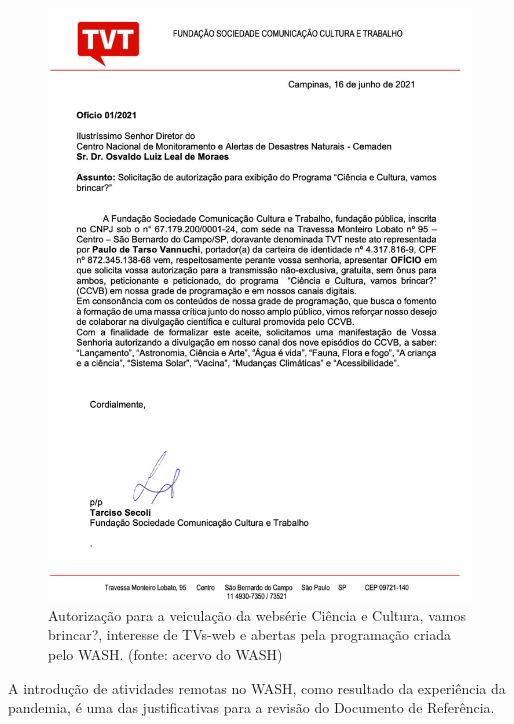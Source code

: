 \captionsetup{format=plain}
\begin{figure}[htb]

\centering


\begin{minipage}[b]{0.4\linewidth}
        \centering
                \includegraphics[width=1.0\linewidth]{../../../imagens/TVT.jpg}
                \caption{Autorização para a veiculação da websérie Ciência e Cultura, vamos brincar?, interesse de TVs-web e abertas pela programação criada pelo WASH. (fonte: acervo do WASH)}
                \label{51f9418c1ca6e2404e9d774513fb6c023d10b3bb}
\end{minipage}%
\hspace{0.5cm}
\end{figure}



A introdução de atividades remotas no WASH, como resultado da experiência da pandemia, é uma das justificativas para a revisão do Documento de Referência.

